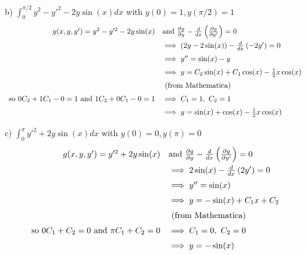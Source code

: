 \documentclass[11pt]{article}
\begin{document}
b) $\int_0^{\pi/2}y^2-y'^2-2y\sin(x) dx$ with $y(0)=1,y(\pi/2)=1$
\[
\def\arraystretch{1.5}
\begin{array}{rl}
    g(x,y,y')=y^2-y'^2-2y\sin(x) &\textrm{and}\ 
    \frac{\partial g}{\partial y}-\frac{d}{dx}\left(\frac{\partial g}{\partial y'}\right)=0 \\
    &\implies (2y-2\sin(x))-\frac{d}{dx}\left(-2y'\right)=0 \\
    &\implies y''=\sin(x)-y \\
    &\implies y=C_2\sin(x)+C_1\cos(x)-\frac{1}{2}x\cos(x) \\
    &\textrm{ (from Mathematica) } \\
    \textrm{so }0C_2+1C_1-0=1\textrm{ and }1C_2+0C_1-0=1 &\implies
    C_1=1,\ C_2=1 \\
    &\implies y=\sin(x)+\cos(x)-\frac{1}{2}x\cos(x)
\end{array}
\]

c) $\int_0^\pi y'^2+2y\sin(x) dx$ with $y(0)=0,y(\pi)=0$
\[
\def\arraystretch{1.5}
\begin{array}{rl}
    g(x,y,y')=y'^2+2y\sin(x) &\textrm{and}\ 
    \frac{\partial g}{\partial y}-\frac{d}{dx}\left(\frac{\partial g}{\partial y'}\right)=0 \\
    &\implies 2\sin(x)-\frac{d}{dx}\left(2y'\right)=0 \\
    &\implies y''=\sin(x) \\
    &\implies y=-\sin(x)+C_1x+C_2\\
    &\textrm{ (from Mathematica) } \\
    \textrm{so }0C_1+C_2=0\textrm{ and }\pi C_1+C_2=0 &\implies
    C_1=0,\ C_2=0 \\
    &\implies y=-\sin(x)
\end{array}
\]
\end{document}
